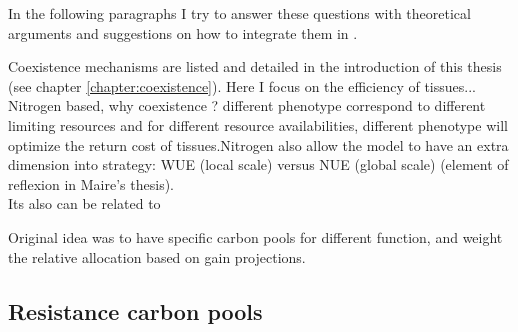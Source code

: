 In the following paragraphs I try to answer these questions with theoretical arguments and suggestions on how to integrate them in \model.


Coexistence mechanisms are listed and detailed in the introduction of this thesis (see chapter \ref{chapter:coexistence}). Here I focus on the efficiency of tissues... Nitrogen based, why coexistence ? different phenotype correspond to different limiting resources and for different resource availabilities, different phenotype will optimize the return cost of tissues.Nitrogen also allow the model to have an extra dimension into strategy: WUE (local scale) versus NUE (global scale) (element of reflexion in Maire's thesis).\\
Its also can be related to



Original idea was to have specific carbon pools for different function, and weight the relative allocation based on gain projections.\\

\subsection{Resistance carbon pools}

%
%
%
%
%






